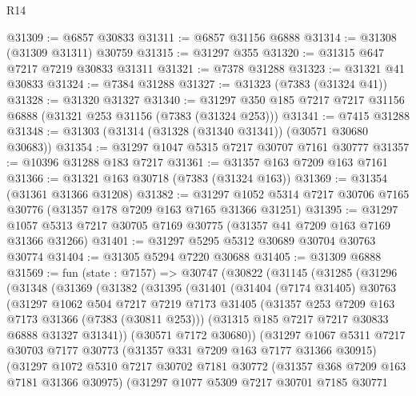 \begin{lexlean}{R14}
\begin{coremodule}
@31309 := @6857 @30833
@31311 := @6857 @31156 @6888
@31314 := @31308 (@31309 @31311) @30759
@31315 := @31297 @355
@31320 := @31315 @647 @7217 @7219 @30833 @31311
@31321 := @7378 @31288
@31323 := @31321 @41 @30833
@31324 := @7384 @31288
@31327 := @31323 (@7383 (@31324 @41))
@31328 := @31320 @31327
@31340 := @31297 @350 @185 @7217 @7217 @31156 @6888 (@31321 @253 @31156 (@7383 (@31324 @253)))
@31341 := @7415 @31288
@31348 := @31303 (@31314 (@31328 (@31340 @31341)) (@30571 @30680 @30683))
@31354 := @31297 @1047 @5315 @7217 @30707 @7161 @30777
@31357 := @10396 @31288 @183 @7217
@31361 := @31357 @163 @7209 @163 @7161
@31366 := @31321 @163 @30718 (@7383 (@31324 @163))
@31369 := @31354 (@31361 @31366 @31208)
@31382 := @31297 @1052 @5314 @7217 @30706 @7165 @30776 (@31357 @178 @7209 @163 @7165 @31366 @31251)
@31395 := @31297 @1057 @5313 @7217 @30705 @7169 @30775 (@31357 @41 @7209 @163 @7169 @31366 @31266)
@31401 := @31297 @5295 @5312 @30689 @30704 @30763 @30774
@31404 := @31305 @5294 @7220 @30688
@31405 := @31309 @6888
@31569 := fun (state : @7157) =>
  @30747
    (@30822
      (@31145
        (@31285
          (@31296
            (@31348
              (@31369
                (@31382
                  (@31395
                    (@31401
                      (@31404
                        (@7174 @31405)
                        @30763
                        (@31297
                          @1062
                          @504
                          @7217
                          @7219
                          @7173
                          @31405
                          (@31357 @253 @7209 @163 @7173 @31366 (@7383 (@30811 @253)))
                          (@31315 @185 @7217 @7217 @30833 @6888 @31327 @31341))
                        (@30571 @7172 @30680))
                      (@31297
                        @1067
                        @5311
                        @7217
                        @30703
                        @7177
                        @30773
                        (@31357 @331 @7209 @163 @7177 @31366 @30915)
                        (@31297
                          @1072
                          @5310
                          @7217
                          @30702
                          @7181
                          @30772
                          (@31357 @368 @7209 @163 @7181 @31366 @30975)
                          (@31297
                            @1077
                            @5309
                            @7217
                            @30701
                            @7185
                            @30771

\end{coremodule}
\end{lexlean}
